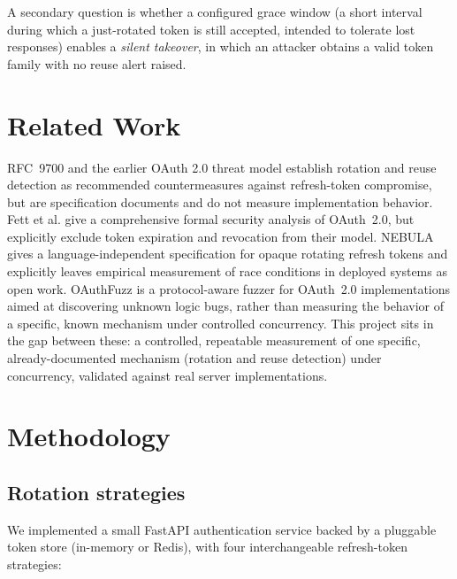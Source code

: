 \documentclass[conference]{IEEEtran}
\begin{document}
A secondary question is whether a configured grace window (a short interval
during which a just-rotated token is still accepted, intended to tolerate
lost responses) enables a \emph{silent takeover}, in which an attacker
obtains a valid token family with no reuse alert raised.

\section{Related Work}

RFC~9700 \cite{rfc9700} and the earlier OAuth 2.0 threat model
\cite{rfc6819} establish rotation and reuse detection as recommended
countermeasures against refresh-token compromise, but are specification
documents and do not measure implementation behavior. Fett et al.
\cite{fett2016} give a comprehensive formal security analysis of OAuth~2.0,
but explicitly exclude token expiration and revocation from their model.
NEBULA \cite{nebula} gives a language-independent specification for opaque
rotating refresh tokens and explicitly leaves empirical measurement of race
conditions in deployed systems as open work. OAuthFuzz \cite{oauthfuzz} is
a protocol-aware fuzzer for OAuth~2.0 implementations aimed at discovering
unknown logic bugs, rather than measuring the behavior of a specific,
known mechanism under controlled concurrency. This project sits in the gap
between these: a controlled, repeatable measurement of one specific,
already-documented mechanism (rotation and reuse detection) under
concurrency, validated against real server implementations.

\section{Methodology}

\subsection{Rotation strategies}

We implemented a small FastAPI authentication service backed by a
pluggable token store (in-memory or Redis), with four interchangeable
refresh-token strategies:
\end{document}
